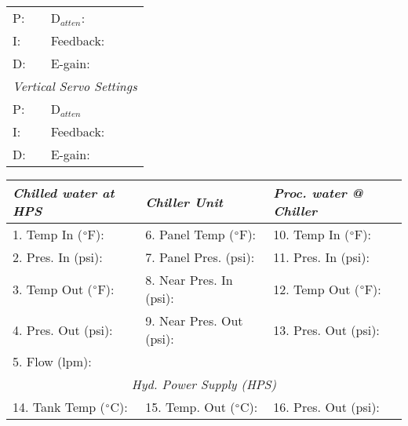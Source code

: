 \documentclass[letterpaper, 10pt]{article}
\begin{document}
\begin{table}[!ht]
        \footnotesize
        \renewcommand{\arraystretch}{1.1}
        \begin{tabular}{ p{1cm}|p{2cm} } \rowcolor[HTML]{EFEFEF}
            \multicolumn{2}{c}{\textit{Horizontal Servo Settings} \cellcolor[HTML]{EFEFEF}} \\ \hline P:  & D$_{atten}$:  \\ \hline
        I:  & Feedback:  \\ \hline 
        D:  & E-gain:  \\ \hline 
        \multicolumn{2}{c}{\textit{Vertical Servo Settings} \cellcolor[HTML]{EFEFEF}} \\ \hline 
        P:  & D$_{atten}$   \\ \hline 
        I:  & Feedback:  \\ \hline
        D:  & E-gain:  \\ \hline 
    \end{tabular} \hfill 
        \renewcommand{\arraystretch}{1.1}
        \begin{tabular}{ l|l|l } \rowcolor[HTML]{EFEFEF}
        \textit{Chilled water at HPS} & \textit{Chiller Unit} & \textit{Proc. water @ Chiller} \\ \hline 1. Temp In ($\degree$F):  & 6. Panel Temp ($\degree$F):  & 10. Temp In ($\degree$F):  \\ \hline 
    2. Pres. In (psi):  & 7. Panel Pres. (psi):  & 11. Pres. In (psi):  \\ \hline 
    3. Temp Out ($\degree$F):  & 8. Near Pres. In (psi): & 12. Temp Out ($\degree$F):  \\ \hline 
    4. Pres. Out (psi): & 9. Near Pres. Out (psi): & 13. Pres. Out (psi):  \\ \hline 
    5. Flow (lpm):  \\ \hline 
    \multicolumn{3}{c}{\textit{Hyd. Power Supply (HPS)} \cellcolor[HTML]{EFEFEF}} \\ \hline 
    14. Tank Temp ($\degree$C):  & 15. Temp. Out ($\degree$C):  & 16. Pres. Out (psi):  \\ \hline 
    \end{tabular} 
    \end{table} \vspace{-0.5cm} 
\end{document}
